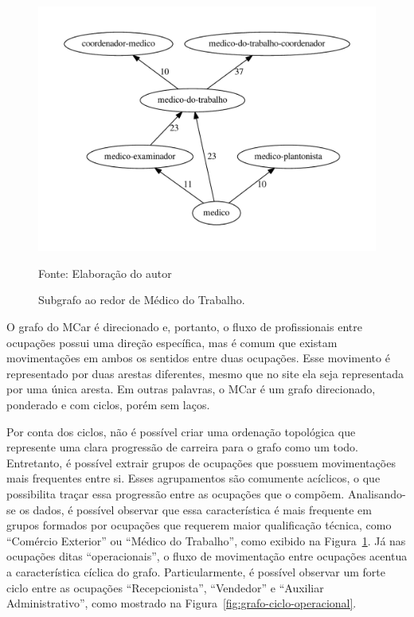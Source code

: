 \documentclass[12pt,a4paper]{article}
\newcommand{\source}[1]{\vspace{-10pt} \caption*{Fonte: {#1}} }
\begin{document}
\begin{figure}[ht]
  \centering
  \includegraphics[scale=0.6]{cluster_24.pdf}
  \caption{Subgrafo ao redor de Médico do Trabalho.}
  \source{Elaboração do autor}
  \label{fig:grafo-medico-do-trabalho}
\end{figure}

O grafo do MCar é direcionado e, portanto, o fluxo de profissionais entre ocupações possui uma direção específica, mas é comum que existam movimentações em ambos os sentidos entre duas ocupações. Esse movimento é representado por duas arestas diferentes, mesmo que no site ela seja representada por uma única aresta. Em outras palavras, o MCar é um grafo direcionado, ponderado e com ciclos, porém sem laços.

Por conta dos ciclos, não é possível criar uma ordenação topológica que represente uma clara progressão de carreira para o grafo como um todo. Entretanto, é possível extrair grupos de ocupações que possuem movimentações mais frequentes entre si. Esses agrupamentos são comumente acíclicos, o que possibilita traçar essa progressão entre as ocupações que o compõem. Analisando-se os dados, é possível observar que essa característica é mais frequente em grupos formados por ocupações que requerem maior qualificação técnica, como \enquote{Comércio Exterior} ou \enquote{Médico do Trabalho}, como exibido na Figura~\ref{fig:grafo-medico-do-trabalho}. Já nas ocupações ditas \enquote{operacionais}, o fluxo de movimentação entre ocupações acentua a característica cíclica do grafo. Particularmente, é possível observar um forte ciclo entre as ocupações \enquote{Recepcionista}, \enquote{Vendedor} e \enquote{Auxiliar Administrativo}, como mostrado na Figura~\ref{fig:grafo-ciclo-operacional}.
\end{document}
